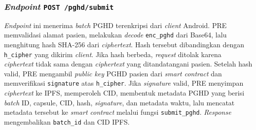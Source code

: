\subsubsection{\textit{Endpoint} \texttt{POST /pghd/submit}}\label{subsubsec:pre-endpoint-pghd-submit}

\textit{Endpoint} ini menerima \textit{batch} PGHD terenkripsi dari \textit{client} Android. 
PRE memvalidasi alamat pasien, melakukan \textit{decode} \texttt{enc\_pghd} dari Base64, lalu menghitung hash SHA-256 dari \textit{ciphertext}. 
Hash tersebut dibandingkan dengan \texttt{h\_cipher} yang dikirim \textit{client}. 
Jika hash berbeda, \textit{request} ditolak karena \textit{ciphertext} tidak sama dengan \textit{ciphertext} yang ditandatangani pasien. 
Setelah hash valid, PRE mengambil \textit{public key} PGHD pasien dari \textit{smart contract} dan memverifikasi \texttt{signature} atas \texttt{h\_cipher}.
Jika \textit{signature} valid, PRE menyimpan \textit{ciphertext} ke IPFS, memperoleh CID, membentuk metadata PGHD yang berisi \textit{batch} ID, capsule, CID, hash, \textit{signature}, dan metadata waktu, lalu mencatat metadata tersebut ke \textit{smart contract} melalui fungsi \texttt{submit\_pghd}. \textit{Response} mengembalikan \texttt{batch\_id} dan CID IPFS\@.

